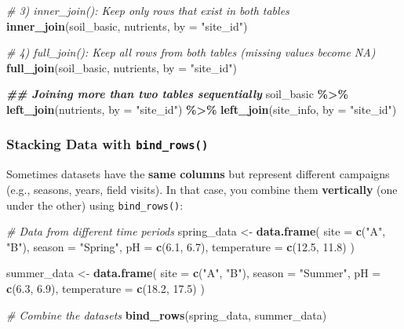 \documentclass[
  10pt,
  b5paper,
  oneside]{book}
\newenvironment{Shaded}{\begin{snugshade}}{\end{snugshade}}
\newcommand{\AttributeTok}[1]{\textcolor[rgb]{0.13,0.29,0.53}{#1}}
\newcommand{\CommentTok}[1]{\textcolor[rgb]{0.56,0.35,0.01}{\textit{#1}}}
\newcommand{\DocumentationTok}[1]{\textcolor[rgb]{0.56,0.35,0.01}{\textbf{\textit{#1}}}}
\newcommand{\FloatTok}[1]{\textcolor[rgb]{0.00,0.00,0.81}{#1}}
\newcommand{\FunctionTok}[1]{\textcolor[rgb]{0.13,0.29,0.53}{\textbf{#1}}}
\newcommand{\NormalTok}[1]{#1}
\newcommand{\OtherTok}[1]{\textcolor[rgb]{0.56,0.35,0.01}{#1}}
\newcommand{\SpecialCharTok}[1]{\textcolor[rgb]{0.81,0.36,0.00}{\textbf{#1}}}
\newcommand{\StringTok}[1]{\textcolor[rgb]{0.31,0.60,0.02}{#1}}
\begin{document}
\begin{Shaded}
\begin{Highlighting}[]
\CommentTok{\# 3) \textasciigrave{}inner\_join()\textasciigrave{}: Keep only rows that exist in both tables}
\FunctionTok{inner\_join}\NormalTok{(soil\_basic, nutrients, }\AttributeTok{by =} \StringTok{"site\_id"}\NormalTok{)}

\CommentTok{\# 4) \textasciigrave{}full\_join()\textasciigrave{}: Keep all rows from both tables (missing values become NA)}
\FunctionTok{full\_join}\NormalTok{(soil\_basic, nutrients, }\AttributeTok{by =} \StringTok{"site\_id"}\NormalTok{)}

\DocumentationTok{\#\# Joining more than two tables sequentially}
\NormalTok{soil\_basic }\SpecialCharTok{\%\textgreater{}\%}
  \FunctionTok{left\_join}\NormalTok{(nutrients, }\AttributeTok{by =} \StringTok{"site\_id"}\NormalTok{) }\SpecialCharTok{\%\textgreater{}\%}
  \FunctionTok{left\_join}\NormalTok{(site\_info, }\AttributeTok{by =} \StringTok{"site\_id"}\NormalTok{)}
\end{Highlighting}
\end{Shaded}

\subsubsection{\texorpdfstring{Stacking Data with \texttt{bind\_rows()}}{Stacking Data with bind\_rows()}}\label{dplyr-bind_rows}

Sometimes datasets have the \textbf{same columns} but represent different campaigns (e.g., seasons, years, field visits). In that case, you combine them \textbf{vertically} (one under the other) using \texttt{bind\_rows()}:

\begin{Shaded}
\begin{Highlighting}[]
\CommentTok{\# Data from different time periods}
\NormalTok{spring\_data }\OtherTok{\textless{}{-}} \FunctionTok{data.frame}\NormalTok{(}
 \AttributeTok{site =} \FunctionTok{c}\NormalTok{(}\StringTok{"A"}\NormalTok{, }\StringTok{"B"}\NormalTok{),}
 \AttributeTok{season =} \StringTok{"Spring"}\NormalTok{,}
 \AttributeTok{pH =} \FunctionTok{c}\NormalTok{(}\FloatTok{6.1}\NormalTok{, }\FloatTok{6.7}\NormalTok{),}
 \AttributeTok{temperature =} \FunctionTok{c}\NormalTok{(}\FloatTok{12.5}\NormalTok{, }\FloatTok{11.8}\NormalTok{)}
\NormalTok{)}

\NormalTok{summer\_data }\OtherTok{\textless{}{-}} \FunctionTok{data.frame}\NormalTok{(}
 \AttributeTok{site =} \FunctionTok{c}\NormalTok{(}\StringTok{"A"}\NormalTok{, }\StringTok{"B"}\NormalTok{),}
 \AttributeTok{season =} \StringTok{"Summer"}\NormalTok{, }
 \AttributeTok{pH =} \FunctionTok{c}\NormalTok{(}\FloatTok{6.3}\NormalTok{, }\FloatTok{6.9}\NormalTok{),}
 \AttributeTok{temperature =} \FunctionTok{c}\NormalTok{(}\FloatTok{18.2}\NormalTok{, }\FloatTok{17.5}\NormalTok{)}
\NormalTok{)}

\CommentTok{\# Combine the datasets}
\FunctionTok{bind\_rows}\NormalTok{(spring\_data, summer\_data)}
\end{Highlighting}
\end{Shaded}
\end{document}
